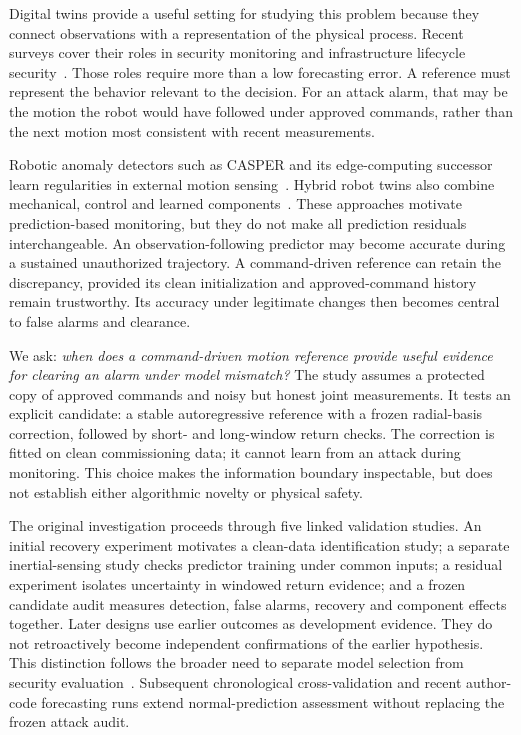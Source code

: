 \documentclass[11pt,twocolumn]{article}
\begin{document}
Digital twins provide a useful setting for studying this problem because they connect observations with a representation of the physical process. Recent surveys cover their roles in security monitoring and infrastructure lifecycle security~\cite{securitysurvey,lifecycle}. Those roles require more than a low forecasting error. A reference must represent the behavior relevant to the decision. For an attack alarm, that may be the motion the robot would have followed under approved commands, rather than the next motion most consistent with recent measurements.

Robotic anomaly detectors such as CASPER and its edge-computing successor learn regularities in external motion sensing~\cite{casper,edge}. Hybrid robot twins also combine mechanical, control and learned components~\cite{hybrid}. These approaches motivate prediction-based monitoring, but they do not make all prediction residuals interchangeable. An observation-following predictor may become accurate during a sustained unauthorized trajectory. A command-driven reference can retain the discrepancy, provided its clean initialization and approved-command history remain trustworthy. Its accuracy under legitimate changes then becomes central to false alarms and clearance.

We ask: \emph{when does a command-driven motion reference provide useful evidence for clearing an alarm under model mismatch?} The study assumes a protected copy of approved commands and noisy but honest joint measurements. It tests an explicit candidate: a stable autoregressive reference with a frozen radial-basis correction, followed by short- and long-window return checks. The correction is fitted on clean commissioning data; it cannot learn from an attack during monitoring. This choice makes the information boundary inspectable, but does not establish either algorithmic novelty or physical safety.

The original investigation proceeds through five linked validation studies. An initial recovery experiment motivates a clean-data identification study; a separate inertial-sensing study checks predictor training under common inputs; a residual experiment isolates uncertainty in windowed return evidence; and a frozen candidate audit measures detection, false alarms, recovery and component effects together. Later designs use earlier outcomes as development evidence. They do not retroactively become independent confirmations of the earlier hypothesis. This distinction follows the broader need to separate model selection from security evaluation~\cite{arp}. Subsequent chronological cross-validation and recent author-code forecasting runs extend normal-prediction assessment without replacing the frozen attack audit.
\end{document}
